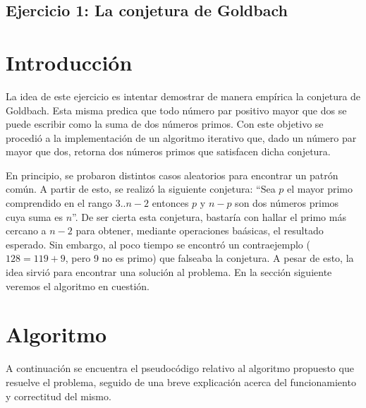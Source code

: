 \documentclass[a4paper,10pt] {article}
\begin{document}
\grupo{}

\maketitle

\begin{center}
\section*{Ejercicio 1: La conjetura de Goldbach}
\end{center}

\bigskip
\section*{Introducci\'on}

La idea de este ejercicio es intentar demostrar de manera emp\'irica la
conjetura de Goldbach. Esta misma predica que todo n\'umero par positivo mayor
que dos se puede escribir como la suma de dos n\'umeros primos. Con este
objetivo se procedi\'o a la implementaci\'on de un algoritmo iterativo que, dado
un n\'umero par mayor que dos, retorna dos n\'umeros primos que satisfacen dicha
conjetura.

En principio, se probaron distintos casos aleatorios para encontrar un patr\'on
com\'un. A partir de esto, se realiz\'o la siguiente conjetura: ``Sea $p$ el mayor primo comprendido en el rango $3..n-2$ entonces $p$ y $n-p$ son dos n\'umeros primos cuya suma es $n$''. De ser cierta esta conjetura, bastar\'ia con hallar el primo m\'as cercano a $n-2$ para obtener, mediante operaciones ba\'asicas, el resultado esperado. Sin embargo, al poco tiempo se encontr\'o un contraejemplo ($128 = 119 + 9$, pero 9 no es primo) que falseaba la conjetura. A pesar de esto, la idea sirvi\'o para encontrar una soluci\'on al problema. En la secci\'on siguiente veremos el algoritmo en cuesti\'on.

\section*{Algoritmo}

A continuaci\'on se encuentra el pseudoc\'odigo relativo al algoritmo propuesto
que resuelve el problema, seguido de una breve explicaci\'on acerca del
funcionamiento y correctitud del mismo.
\end{document}
